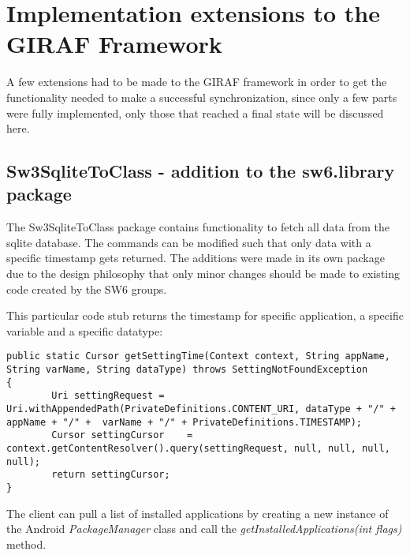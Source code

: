 \section{Implementation extensions to the GIRAF Framework}
A few extensions had to be made to the GIRAF framework in order to get the functionality needed to make a successful synchronization, since only a few parts were fully implemented, only those that reached a final state will be discussed here. 

\subsection{Sw3SqliteToClass - addition to the sw6.library package}
The Sw3SqliteToClass package contains functionality to fetch all data from the sqlite database. The commands can be modified such that only data with a specific timestamp gets returned. The additions were made in its own package due to the design philosophy that only minor changes should be made to existing code created by the SW6 groups.

This particular code stub returns the timestamp for specific application, a specific variable and a specific datatype:

\lstset{language=JAVA}
\begin{lstlisting}
public static Cursor getSettingTime(Context context, String appName, String varName, String dataType) throws SettingNotFoundException 
{
		Uri settingRequest = Uri.withAppendedPath(PrivateDefinitions.CONTENT_URI, dataType + "/" + appName + "/" +  varName + "/" + PrivateDefinitions.TIMESTAMP);
		Cursor settingCursor 	= context.getContentResolver().query(settingRequest, null, null, null, null);	
		return settingCursor;
}
\end{lstlisting}

The client can pull a list of installed applications by creating a new instance of the Android \emph{PackageManager} class and call the \emph{getInstalledApplications(int flags)} method\cite{AndDevel2}.
